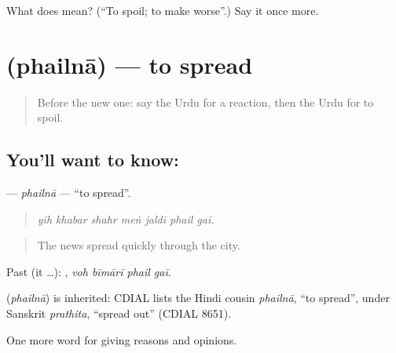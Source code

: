 \begin{tcolorbox}[breakable,colback=teal!4,colframe=teal!35!black,title={Before you move on}]
What does  mean? (\textquotedblleft{}To spoil; to make worse\textquotedblright{}.) Say it once more.
\end{tcolorbox}
\section[\texorpdfstring{\ur{پھیلنا} (phailnā)}{پھیلنا (phailnā)}]{ (phailnā) — to spread}

\label{lesson:UR-C332-phailna}



\begin{quote}
Before the new one: say the Urdu for a reaction, then the Urdu for to spoil.
\end{quote}

\subsection*{You'll want to know: }
\textbf{} — \emph{phailnā} — \textquotedblleft{}to spread\textquotedblright{}.

\begin{quote}
      
\end{quote}

\begin{quote}
\emph{yih khabar shahr meṅ jaldī phail gaī.}
\end{quote}

\begin{quote}
The news spread quickly through the city.
\end{quote}

Past (it …):    , \emph{voh bīmārī phail gaī}.

\begin{cousinweb}
\textbf{} (\emph{phailnā}) is inherited: CDIAL lists the Hindi cousin \emph{phailnā}, \textquotedblleft{}to spread\textquotedblright{}, under Sanskrit \emph{prathita}, \textquotedblleft{}spread out\textquotedblright{} (CDIAL 8651).
\end{cousinweb}

\begin{grammarlens}[title={What you've built}]
One more word for giving reasons and opinions.
\end{grammarlens}


